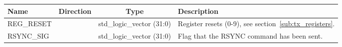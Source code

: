 \documentclass[]{article}
\newcommand*{\dittostraight}{---\textquotedbl---} %
\begin{document}
    \begin{table}
        \begin{center}
            \begin{tabulary}{\textwidth}{l | c | c | L}
                Name & Direction & Type & Description \\
                \hline
                REG\_RESET              & & std\_logic\_vector (31:0) &  Register resets (0-9), see section~\ref{sub:tx_registers}. \\
                RSYNC\_SIG            & & std\_logic\_vector (31:0) & Flag that the RSYNC command has been sent.                 \\

\end{tabulary}
\end{center}
\end{table}
\end{document}

